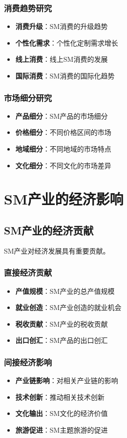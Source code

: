 \documentclass[12pt,UTF8]{ctexbook}
\begin{document}
\subsection{消费趋势研究}
\begin{itemize}[leftmargin=2cm]
	\item \textbf{消费升级}：SM消费的升级趋势
	\item \textbf{个性化需求}：个性化定制需求增长
	\item \textbf{线上消费}：线上SM消费的发展
	\item \textbf{国际消费}：SM消费的国际化趋势
\end{itemize}

\subsection{市场细分研究}
\begin{itemize}[leftmargin=2cm]
	\item \textbf{产品细分}：SM产品的市场细分
	\item \textbf{价格细分}：不同价格区间的市场
	\item \textbf{地域细分}：不同地域的市场特点
	\item \textbf{文化细分}：不同文化的市场差异
\end{itemize}

\chapter{SM产业的经济影响}
\section{SM产业的经济贡献}
SM产业对经济发展具有重要贡献。

\subsection{直接经济贡献}
\begin{itemize}[leftmargin=2cm]
	\item \textbf{产值规模}：SM产业的总产值规模
	\item \textbf{就业创造}：SM产业创造的就业机会
	\item \textbf{税收贡献}：SM产业的税收贡献
	\item \textbf{出口创汇}：SM产品的出口创汇
\end{itemize}

\subsection{间接经济影响}
\begin{itemize}[leftmargin=2cm]
	\item \textbf{产业链影响}：对相关产业链的影响
	\item \textbf{技术创新}：推动相关技术创新
	\item \textbf{文化输出}：SM文化的经济价值
	\item \textbf{旅游促进}：SM主题旅游的促进
\end{itemize}
\end{document}
